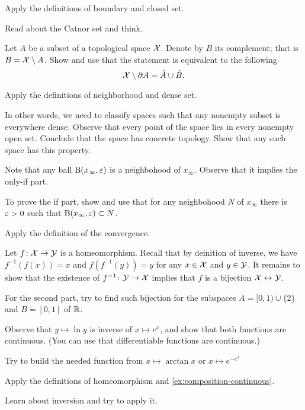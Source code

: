 \begin{multicols}{2}
Apply the definitions of boundary and closed set.

Read about the Catnor set and think.

Let $A$ be a subset of a topological space $\mathcal{X}$.
Denote by $B$ its complement; that is $B\z=\c{X}\setminus A$.
Show and use that the statement is equivalent to the following 
\[\mathcal{X}\setminus\partial A =\mathring A\cup \mathring B.\]

Apply the definitions of neighborhood and dense set.

In other words, we need to classify spaces such that any nonempty subset is everywhere dense.
Observe that every point of the space lies in every nonempty open set.
Conclude that the space has concrete topology.
Show that any such space has this property.

Note that any ball $\mathrm{B}(x_\infty,\varepsilon)$ is a neighbohood of $x_\infty$.
Observe that it implies the only-if part.

To prove the if part, show and use that for any neighbohood $N$ of $x_\infty$ there is $\varepsilon>0$ such that $\mathrm{B}(x_\infty,\varepsilon)\subset N$.

Apply the definition of the convergence.

Let $f\colon\mathcal{X}\to\mathcal{Y}$ is a homeomorphism.
Recall that by deinition of inverse, we have $f^{-1}(f(x))=x$ and $f(f^{-1}(y))=y$ for any $x\in \mathcal{X}$ and $y\in\mathcal{Y}$.
It remains to show that the existence of $f^{-1}\colon\mathcal{Y}\to\mathcal{X}$ implies that $f$ is a bijection $\mathcal{X}\leftrightarrow\mathcal{Y}$.

For the second part,
try to find such bijection for the subspaces $A=[0,1)\cup \{2\}$ and $B=[0,1]$ of $\mathbb{R}$.

Observe that $y\mapsto \ln y$ is inverse of $x\mapsto e^x$,
and show that both functions are continuous.
(You can use that differentiable functions are continuous.)

Try to build the needed function from $x\mapsto \arctan x$ or $x\mapsto e^{-e^x}$

Apply the definitions of homeomorphism and \ref{ex:composition-continuous}.

Learn about inversion and try to apply it.


\end{multicols}
